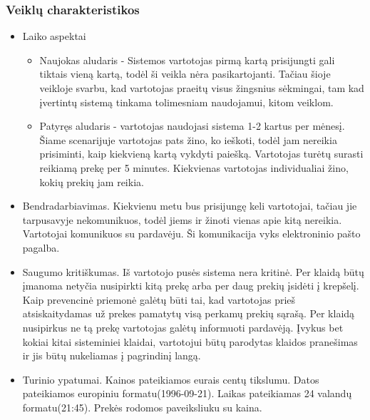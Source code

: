 \documentclass[oneside]{VUMIFPSkursinis}
\begin{document}
		\subsubsection{Veiklų charakteristikos}
				\begin{itemize}
					\item{Laiko aspektai}
								
						\begin{itemize}
								\item{Naujokas aludaris - Sistemos vartotojas pirmą kartą prisijungti gali tiktais vieną kartą, todėl ši veikla nėra pasikartojanti.
						Tačiau šioje veikloje svarbu, kad vartotojas praeitų visus žingsnius sėkmingai, tam kad įvertintų sistemą tinkama tolimesniam naudojamui, kitom veiklom. }
								\item{Patyręs aludaris - vartotojas naudojasi sistema 1-2 kartus per mėnesį.
						Šiame scenarijuje vartotojas pats žino, ko ieškoti, todėl jam nereikia prisiminti, kaip kiekvieną kartą vykdyti paiešką.
						Vartotojas turėtų surasti reikiamą prekę per 5 minutes.
						Kiekvienas vartotojas individualiai žino, kokių prekių jam reikia.}
						\end{itemize}
					\item{Bendradarbiavimas.}
						Kiekvienu metu bus prisijungę keli vartotojai, tačiau jie tarpusavyje nekomunikuos, todėl jiems ir žinoti vienas apie kitą nereikia. 
						Vartotojai komunikuos su pardavėju. 
						Ši komunikacija vyks elektroninio pašto pagalba.
			
					\item{Saugumo kritiškumas.}
						Iš vartotojo pusės sistema nera kritinė.
						Per klaidą būtų įmanoma netyčia nusipirkti kitą prekę arba per daug prekių įsidėti į krepšelį.
						Kaip prevencinė priemonė galėtų būti tai, kad vartotojas prieš atsiskaitydamas už prekes pamatytų visą perkamų prekių sąrašą. 
						Per klaidą nusipirkus ne tą prekę vartotojas galėtų informuoti pardavėją. 
						Įvykus bet kokiai kitai sisteminiei klaidai, vartotojui būtų parodytas klaidos pranešimas ir jis būtų nukeliamas į pagrindinį langą.
					\item{Turinio ypatumai.}
						Kainos pateikiamos eurais centų tikslumu.
						Datos pateikiamos europiniu formatu(1996-09-21).
						Laikas pateikiamas 24 valandų formatu(21:45).
						Prekės rodomos paveiksliuku su kaina.
						
					
				\end{itemize}
\end{document}
